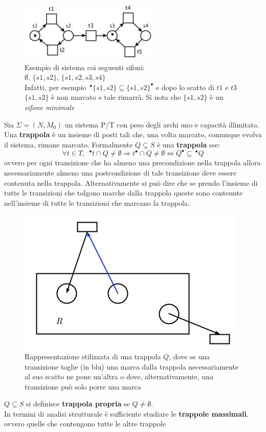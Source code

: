 \documentclass[a4paper,12pt, oneside]{book}
\begin{document}
\begin{figure}[H]
  \centering
  \includegraphics[scale = 0.6]{img/sfi2.jpg}
  \caption{Esempio di sistema coi seguenti sifoni: \\
    $\emptyset,\,\{s1 ,s2\},\,\{s1 , s2 , s3 , s4\}$\\
    Infatti, per esempio
    $\,^\bullet\{s1,s2\}\subseteq \{s1,s2\}^\bullet$ e dopo lo scatto di $t1$
    e $t3$ $\{s1,s2\}$ è non marcato e tale rimarrà. Si nota che $\{s1,s2\}$ è
    un \emph{sifone minimale}}
\end{figure}
\begin{definizione}
  Sia $\Sigma=(N,M_0)$ un sistema P/T con peso degli archi uno e capacità
  illimitata. \\
  Una \textbf{trappola} è un insieme di posti tali che, una volta marcato,
  comunque evolva il sistema, rimane marcato. Formalmente $Q\subseteq S$ è una
  \textbf{trappola} sse:
  \[\forall t\in T, \,\,\,^\bullet t\cap Q\neq \emptyset\Rightarrow t^\bullet
    \cap Q\neq \emptyset \Longleftrightarrow Q^\bullet \subseteq \,^\bullet Q\]
  ovvero per ogni transizione che ha almeno una precondizione nella trappola
  allora necessariamente almeno una postcondizione di tale transizione deve
  essere contenuta nella trappola. Alternativamente si può dire che se prendo
  l'insieme di tutte le transizioni che tolgono marche dalla trappola queste
  sono contenute nell'insieme di tutte le transizioni che marcano la trappola.
  \begin{figure}[H]
    \centering
    \includegraphics[scale = 0.45]{img/sif.jpg}
    \caption{Rappresentazione stilizzata di una trappola $Q$, dove se una
      transizione toglie (in blu) una marca dalla trappola necessariamente al
      suo scatto ne pone un'altra o dove, alternativamente, una transizione può
      solo porre una marca}   
  \end{figure}
  $Q\subseteq S$ si definisce \textbf{trappola propria} se $Q\neq \emptyset$.\\
  In termini di analisi strutturale è sufficiente studiare le \textbf{trappole
    massimali}, ovvero quelle che contengono tutte le altre trappole 
\end{definizione}
\end{document}
